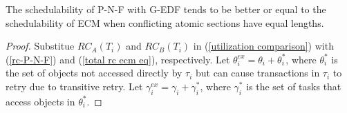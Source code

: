 \begin{clm}\label{P-N-F ecf comaprison clm}
The schedulability of P-N-F with G-EDF tends to be
 better or equal to the schedulability  of ECM when conflicting atomic sections have equal lengths.
\end{clm}
\begin{proof}
Substitue $RC_{A}(T_{i})$ and $RC_{B}(T_{i})$ in (\ref{utilization comparison})
with (\ref{rc-P-N-F}) and (\ref{total rc ecm eq}), respectively. Let $\theta_{i}^{ex}=\theta_{i}+\theta_{i}^{*}$, where $\theta_{i}^{*}$
is the set of objects not accessed directly by $\tau_{i}$ but can
cause transactions in $\tau_{i}$ to retry due to transitive retry.
Let $\gamma_{i}^{ex}=\gamma_{i}+\gamma_{i}^{*}$, where $\gamma_{i}^{*}$
is the set of tasks that access objects in $\theta_{i}^{*}$.


\end{proof}
